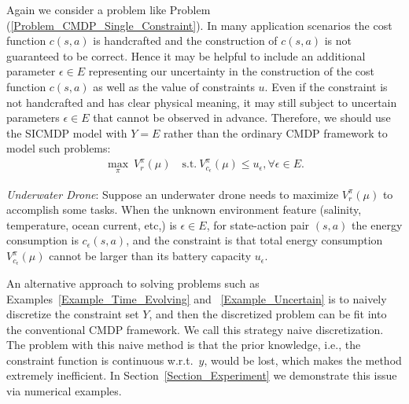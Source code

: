 \begin{example}\label{Example_Uncertain}
Again we consider a problem like Problem (\ref{Problem_CMDP_Single_Constraint}).
In many application scenarios the cost function $c(s,a)$ is handcrafted and the construction of $c(s,a)$ is not guaranteed to be correct.
Hence it may be helpful to include an additional parameter $\epsilon\in E$ representing our uncertainty in the construction of the cost function $c(s,a)$ as well as the value of constraints $u$.
Even if the constraint is not handcrafted and has clear physical meaning, it may still subject to uncertain parameters $\epsilon\in E$ that cannot be observed in advance.
Therefore, we should use the SICMDP model with $Y=E$ rather than the ordinary CMDP framework to model such problems:
\begin{equation}\label{Problem_SICMDP_Uncertain}
\begin{aligned}
\max_{\pi}\ V_r^\pi(\mu)\quad
\text{s.t.}\ V_{c_\epsilon}^\pi(\mu) \leq u_\epsilon, \forall \epsilon\in E.
\end{aligned}
\end{equation}

\textit{Underwater Drone}: Suppose an underwater drone needs to maximize $V_r^\pi(\mu)$ to accomplish some tasks.
When the unknown environment feature (salinity, temperature, ocean current, etc,) is $\epsilon\in E$, for state-action pair $(s,a)$ the energy consumption is $c_\epsilon(s,a)$, and the constraint is that total energy consumption $V_{c_\epsilon}^\pi(\mu)$ cannot be larger than its battery capacity $u_\epsilon$.
\end{example}

\begin{remark}\label{Remark_Baseline}
An alternative approach to solving problems such as Examples~\ref{Example_Time_Evolving} and ~\ref{Example_Uncertain} is to naively discretize the constraint set $Y$, and then the discretized problem can be fit into the conventional CMDP framework.
We call this strategy naive discretization.
The problem with this naive method is that the prior knowledge, i.e., the constraint function is continuous w.r.t.\ $y$, would be lost, which makes the method extremely inefficient.
In Section~\ref{Section_Experiment} we demonstrate this issue via numerical examples.


\end{remark}

